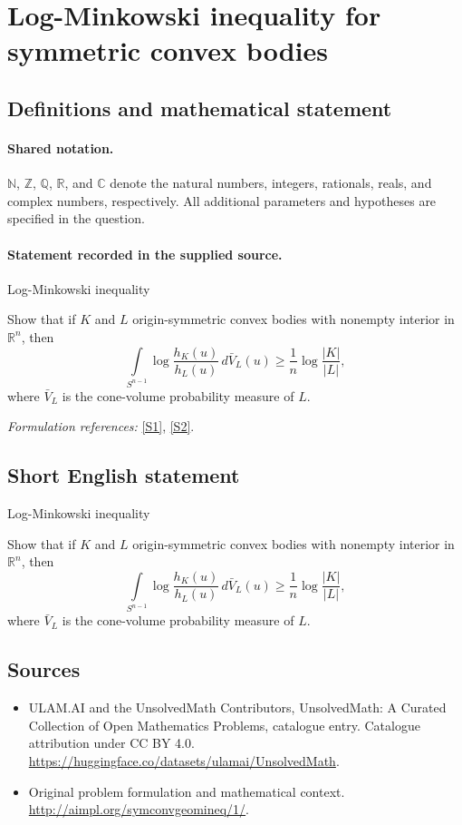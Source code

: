 \documentclass[11pt]{article}
\newcommand{\R}{\mathbb R}
\newcommand{\sref}[2]{\hyperlink{source:#1:#2}{[S#2]}}
\begin{document}
\section{Log-Minkowski inequality for symmetric convex bodies}\label{statement}

\subsection{Definitions and mathematical statement}

\paragraph{Shared notation.}$\mathbb N$, $\mathbb Z$, $\mathbb Q$, $\mathbb R$, and $\mathbb C$ denote the natural numbers, integers, rationals, reals, and complex numbers, respectively. All additional parameters and hypotheses are specified in the question.


\paragraph{Statement recorded in the supplied source.}
Log-Minkowski inequality

Show that if $K$ and $L$ origin-symmetric convex bodies with nonempty interior in $\R^n$, then
$$
\int\limits_{S^{n-1}} \log{\frac{h_K(u)}{h_L(u)}}\,d\bar{V}_L(u) \geq \frac1n \log{\frac{|K|}{|L|}},
$$
where $\bar{V}_L$ is the cone-volume probability measure of $L$.
\par\smallskip\textit{Formulation references:} \sref{statement}{1}, \sref{statement}{2}.
\subsection{Short English statement}
Log-Minkowski inequality

Show that if $K$ and $L$ origin-symmetric convex bodies with nonempty interior in $\R^n$, then
$$
\int\limits_{S^{n-1}} \log{\frac{h_K(u)}{h_L(u)}}\,d\bar{V}_L(u) \geq \frac1n \log{\frac{|K|}{|L|}},
$$
where $\bar{V}_L$ is the cone-volume probability measure of $L$.
\subsection{Sources}
\begin{itemize}
\item[\hypertarget{source:statement:1}{S1}] ULAM.AI and the UnsolvedMath Contributors, UnsolvedMath: A Curated Collection of Open Mathematics Problems, catalogue entry. Catalogue attribution under CC BY 4.0.
\url{https://huggingface.co/datasets/ulamai/UnsolvedMath}.
\item[\hypertarget{source:statement:2}{S2}] Original problem formulation and mathematical context.
\url{http://aimpl.org/symconvgeomineq/1/}.
\end{itemize}
\label{end:statement}
\end{document}
